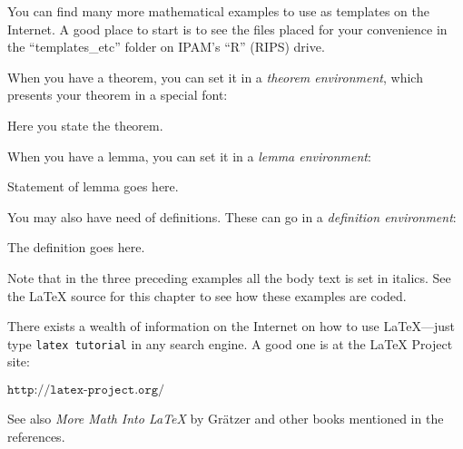You can find many more mathematical examples to use as templates on the Internet.
A good place to start is to see the files placed for your convenience in the ``templates\_etc'' folder on IPAM's ``R''  (RIPS) drive.

When you have a theorem, you can set it in a {\em theorem environment}, which
presents your theorem in a special font:

\begin{theorem}
Here you state the theorem.
\end{theorem}

\noindent When you have a lemma, you can set it in a {\em lemma environment}:

\begin{lemma}
Statement of lemma goes here.
\end{lemma}

\noindent You may also have need of definitions.  These can go in a {\em definition environment}:

\begin{definition}
The definition goes here.
\end{definition}

\noindent Note that in the three preceding examples all the body text is set in italics.  See the {\LaTeX} source for this chapter to see how these examples are coded.

\vspace{8pt}

There exists a wealth of information on the Internet on how to use {\LaTeX}---just type {\tt latex tutorial} in any search engine.
A good one is at the LaTeX Project site:

\vspace{8pt}
$\texttt{http://latex-project.org/}$

\vspace{8pt}
\noindent See also \emph{More Math Into {\LaTeX}} by Gr\"{a}tzer
\cite{gratzer} and other books mentioned in the references.


 \endinput
